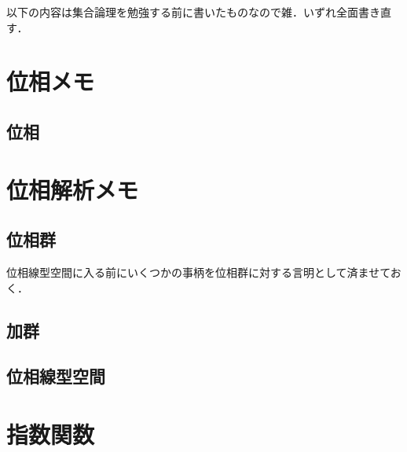 \documentclass[a4j,10.5pt,oneside,openany]{jsbook}
\theoremstyle{mystyle}
\begin{document}
\newpage	
以下の内容は集合論理を勉強する前に書いたものなので雑．いずれ全面書き直す．
\chapter{位相メモ}
	\section{位相}
		
		
		
		
		
		
		
		
	
	
	
	
	
	
	

\chapter{位相解析メモ}
	\section{位相群}
		位相線型空間に入る前にいくつかの事柄を位相群に対する言明として済ませておく．
		
		
		
	\section{加群}
		
		
	\section{位相線型空間}
		
		
		
		
		
		

\chapter{指数関数}
		
		
		
		
		
		
		
		
\end{document}
